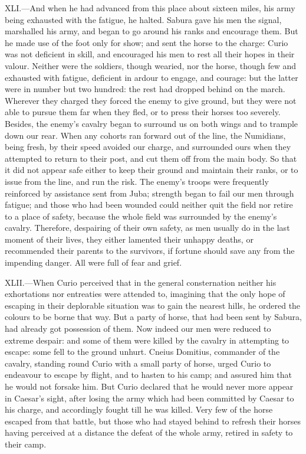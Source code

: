 XLI.—And when he had advanced from this place about sixteen miles, his
army being exhausted with the fatigue, he halted. Sabura gave his men
the signal, marshalled his army, and began to go around his ranks and
encourage them. But he made use of the foot only for show; and sent the
horse to the charge: Curio was not deficient in skill, and encouraged
his men to rest all their hopes in their valour. Neither were the
soldiers, though wearied, nor the horse, though few and exhausted with
fatigue, deficient in ardour to engage, and courage: but the latter were
in number but two hundred: the rest had dropped behind on the march.
Wherever they charged they forced the enemy to give ground, but they
were not able to pursue them far when they fled, or to press their
horses too severely. Besides, the enemy's cavalry began to surround us
on both wings and to trample down our rear. When any cohorts ran forward
out of the line, the Numidians, being fresh, by their speed avoided our
charge, and surrounded ours when they attempted to return to their post,
and cut them off from the main body. So that it did not appear safe
either to keep their ground and maintain their ranks, or to issue from
the line, and run the risk. The enemy's troops were frequently
reinforced by assistance sent from Juba; strength began to fail our men
through fatigue; and those who had been wounded could neither quit the
field nor retire to a place of safety, because the whole field was
surrounded by the enemy's cavalry. Therefore, despairing of their own
safety, as men usually do in the last moment of their lives, they either
lamented their unhappy deaths, or recommended their parents to the
survivors, if fortune should save any from the impending danger. All
were full of fear and grief.

XLII.—When Curio perceived that in the general consternation neither
his exhortations nor entreaties were attended to, imagining that the
only hope of escaping in their deplorable situation was to gain the
nearest hills, he ordered the colours to be borne that way. But a party
of horse, that had been sent by Sabura, had already got possession of
them. Now indeed our men were reduced to extreme despair: and some of
them were killed by the cavalry in attempting to escape: some fell to
the ground unhurt. Cneius Domitius, commander of the cavalry, standing
round Curio with a small party of horse, urged Curio to endeavour to
escape by flight, and to hasten to his camp; and assured him that he
would not forsake him. But Curio declared that he would never more
appear in Caesar's sight, after losing the army which had been committed
by Caesar to his charge, and accordingly fought till he was killed. Very
few of the horse escaped from that battle, but those who had stayed
behind to refresh their horses having perceived at a distance the defeat
of the whole army, retired in safety to their camp.


